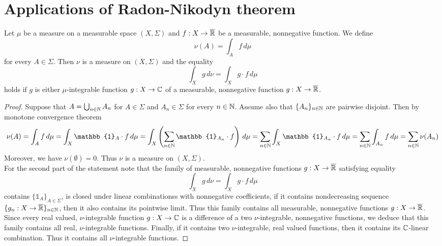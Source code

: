\section{Applications of Radon-Nikodyn theorem}

\begin{proposition}\label{proposition:derivativeandintegration}
    Let $\mu$ be a measure on a measurable space $(X,\Sigma)$ and $f:X\rightarrow \overline{{\mathbb R}}$ be a measurable, nonnegative function. We define
    $$\nu(A) = \int_Af\,d\mu$$
    for every $A\in \Sigma$. Then $\nu$ is a measure on $(X,\Sigma)$ and the equality
    $$\int_X g\,d\nu =\int_Xg\cdot f\,d\mu$$
    holds if $g$ is either $\mu$-integrable function $g:X\rightarrow {\mathbb C}$ of a measurable, nonnegative function $g:X\rightarrow \overline{{\mathbb R}}$.
\end{proposition}
\begin{proof}
    Suppose that $A = \bigcup_{n\in {\mathbb N}}A_n$ for $A\in \Sigma$ and $A_n\in \Sigma$ for every $n\in {\mathbb N}$. Assume also that $\{A_n\}_{n\in {\mathbb N}}$ are pairwise disjoint. Then by monotone convergence theorem
    $$\nu(A) = \int_A f\,d\mu = \int_X\mathbb{1}_A\cdot f\,d\mu = \int_X\left(\sum_{n\in \NN}\mathbb{1}_{A_n}\cdot f\right)\,d\mu = \sum_{n\in \NN}\int_X\mathbb{1}_{A_n}\cdot f\,d\mu = \sum_{n\in \NN}\int_{A_n}f\,d\mu = \sum_{n\in \NN}\nu(A_n)$$
    Moreover, we have $\nu(\emptyset) = 0$. Thus $\nu$ is a measure on $(X,\Sigma)$.\\
    For the second part of the statement note that the family of measurable, nonnegative functions $g:X\rightarrow \overline{{\mathbb R}}$ satisfying equality
    $$\int_Xg\,d\nu = \int_Xg\cdot f\,d\mu$$
    contains $\{\mathbb{1}_A\}_{A\in \Sigma}$, is closed under linear combinationss with nonnegative coefficients, if it contains nondecreasing sequence $\{g_n:X\rightarrow \overline{{\mathbb R}}\}_{n\in {\mathbb N}}$, then it also contains its pointwise limit. Thus this family contains all measurable, nonnegative functions $g:X\rightarrow \overline{{\mathbb R}}$. Since every real valued, $\nu$-integrable function $g:X\rightarrow {\mathbb C}$ is a difference of a two $\nu$-integrable, nonnegative functions, we deduce that this family contains all real, $\nu$-integrable functions. Finally, if it contains two $\nu$-integrable, real valued functions, then it contains its ${\mathbb C}$-linear combination. Thus it contains all $\nu$-integrable functions.
\end{proof}

